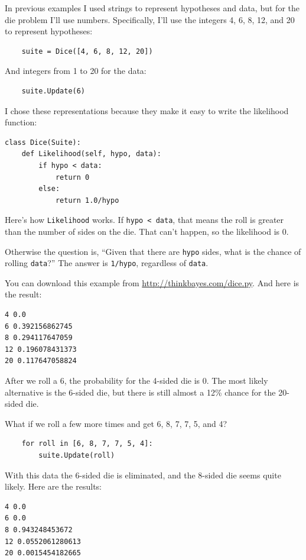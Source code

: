 \documentclass[12pt]{book}
\begin{document}
In previous examples I used strings to represent hypotheses and
data, but for the die problem I'll use numbers.  Specifically,
I'll use the integers 4, 6, 8, 12, and 20 to represent hypotheses:

\begin{verbatim}
    suite = Dice([4, 6, 8, 12, 20])
\end{verbatim}

And integers from 1 to 20 for the data:

\begin{verbatim}
    suite.Update(6)
\end{verbatim}

I chose these representations because they make it easy to
write the likelihood function:

\begin{verbatim}
class Dice(Suite):
    def Likelihood(self, hypo, data):
        if hypo < data:
            return 0
        else:
            return 1.0/hypo
\end{verbatim}

Here's how \verb"Likelihood" works.  If \verb"hypo < data", that
means the roll is greater than the number of sides on the die.
That can't happen, so the likelihood is 0.

Otherwise the question is, ``Given that there are {\tt hypo}
sides, what is the chance of rolling {\tt data}?''  The
answer is \verb"1/hypo", regardless of {\tt data}.

You can download this example from \url{http://thinkbayes.com/dice.py}.
And here is the result:

\begin{verbatim}
4 0.0
6 0.392156862745
8 0.294117647059
12 0.196078431373
20 0.117647058824
\end{verbatim}

After we roll a 6, the probability for the 4-sided die is 0.  The
most likely alternative is the 6-sided die, but there is still
almost a 12\% chance for the 20-sided die.

What if we roll a few more times and get 6, 8, 7, 7, 5, and 4?

\begin{verbatim}
    for roll in [6, 8, 7, 7, 5, 4]:
        suite.Update(roll)
\end{verbatim}

With this data the 6-sided die is eliminated, and the 8-sided
die seems quite likely.  Here are the results:

\begin{verbatim}
4 0.0
6 0.0
8 0.943248453672
12 0.0552061280613
20 0.0015454182665
\end{verbatim}
\end{document}

